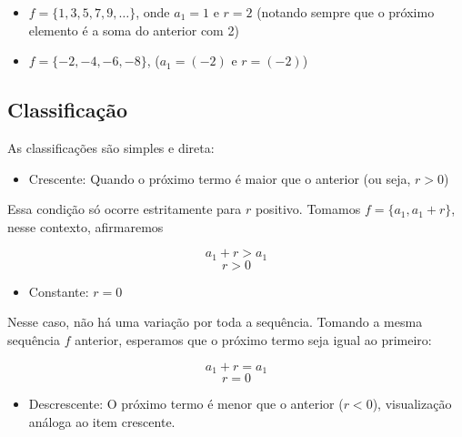 \documentclass[11pt]{article}
\begin{document}
\begin{tcolorbox}[colback=LightGreen]
\begin{itemize}
        \item $f = \{1, 3, 5, 7, 9, \dots\}$, onde $a_{1} = 1$ e $r = 2$ (notando sempre que o próximo elemento é a soma do anterior com 2)

        \item $f = \{-2, -4, -6, -8\}$, ($a_{1} = (-2)$ e $r = (-2)$)
\end{itemize}
\end{tcolorbox}

\subsection{Classificação}

As classificações são simples e direta:

\begin{tcolorbox}[colback=LightGreen]
\begin{itemize}
        \item Crescente: Quando o próximo termo é maior que o anterior (ou seja, $r > 0$)
\end{itemize}

Essa condição só ocorre estritamente para $r$ positivo. Tomamos $f = \{a_{1}, a_{1} + r\}$, nesse contexto, afirmaremos

\[a_{1} + r > a_{1}\]
\[r > 0\]
\end{tcolorbox}


\begin{tcolorbox}[colback=LightGreen]
\begin{itemize}
  \item Constante: $r = 0$
\end{itemize}

Nesse caso, não há uma variação por toda a sequência. Tomando a mesma sequência $f$ anterior, esperamos que o próximo termo seja igual ao primeiro:

\[a_{1} + r = a_{1}\]
\[r = 0\]
\end{tcolorbox}

\begin{tcolorbox}[colback=LightGreen]
\begin{itemize}
  \item Descrescente: O próximo termo é menor que o anterior ($r < 0$), visualização análoga ao item crescente.
\end{itemize}
\end{tcolorbox}
\end{document}
